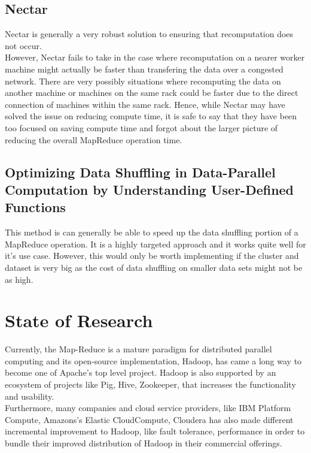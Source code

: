 \documentclass[]{article}
\begin{document}
\subsection{Nectar}

Nectar is generally a very robust solution to ensuring that recomputation does not occur.\\

However, Nectar fails to take in the case where recomputation on a nearer worker machine might actually be faster than transfering the data over a congested network. There are very possibly situations where recomputing the data on another machine or machines on the same rack could be faster due to the direct connection of machines within the same rack. Hence, while Nectar may have solved the issue on reducing compute time, it is safe to say that they have been too focused on saving compute time and forgot about the larger picture of reducing the overall MapReduce operation time.\\

\subsection{Optimizing Data Shuffling in Data-Parallel Computation by Understanding User-Defined Functions}

This method is can generally be able to speed up the data shuffling portion of a MapReduce operation. It is a highly targeted approach and it works quite well for it's use case. However, this would only be worth implementing if the cluster and dataset is very big as the cost of data shuffling on smaller data sets might not be as high.\\

\section{State of Research}
Currently, the Map-Reduce is a mature paradigm for distributed parallel computing and its open-source implementation, Hadoop\cite{apache_hadoop}, has came a long way to become one of Apache’s top level project. Hadoop is also supported by an ecosystem of projects like Pig\cite{apache_pig}, Hive\cite{apache_hive}, Zookeeper\cite{apache_zookeeper}, that increases the functionality and usability.\\

Furthermore, many companies and cloud service providers, like IBM Platform Compute\cite{ibm_pc}, Amazons’s Elastic CloudCompute\cite{aws_emr}, Cloudera\cite{cloudera} has also made different incremental improvement to Hadoop, like fault tolerance, performance in order to bundle their improved distribution of Hadoop in their commercial offerings. \\
\end{document}
